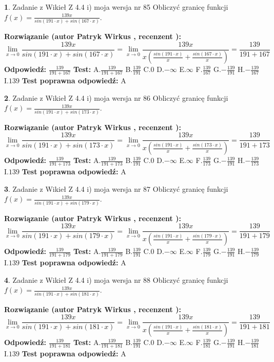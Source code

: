 \documentclass[12pt, a4paper]{article}
\theoremstyle{definition} %
\newtheorem{zad}{}
\newcommand{\zadStart}[1]{\begin{zad}#1\newline}
\newcommand{\zadStop}{\end{zad}}
\newcommand{\rozwStart}[2]{\noindent \textbf{Rozwiązanie (autor #1 , recenzent #2): }\newline}
\newcommand{\rozwStop}{\newline}
\newcommand{\odpStart}{\noindent \textbf{Odpowiedź:}\newline}
\newcommand{\odpStop}{\newline}
\newcommand{\testStart}{\noindent \textbf{Test:}\newline}
\newcommand{\testStop}{\newline}
\newcommand{\kluczStart}{\noindent \textbf{Test poprawna odpowiedź:}\newline}
\newcommand{\kluczStop}{\newline}
\begin{document}
\zadStart{Zadanie z Wikieł Z 4.4 i) moja wersja nr 85}
Obliczyć granicę funkcji $f(x)=\frac{139x}{sin(191\cdot x) +sin(167\cdot x)}$.
\zadStop
\rozwStart{Patryk Wirkus}{}
$$\lim\limits_{x\to 0}\frac{139x}{sin(191\cdot x) +sin(167\cdot x)}=\lim\limits_{x\to 0}\frac{139x}{x(\frac{sin(191\cdot x)}{x}+\frac{sin(167\cdot x)}{x})}=\frac{139}{191+167}$$
\rozwStop
\odpStart
$\frac{139}{191+167}$
\odpStop
\testStart
A.$\frac{139}{191+167}$
B.$\frac{139}{191}$
C.$0$
D.$-\infty$
E.$\infty$
F.$\frac{139}{167}$
G.$-\frac{139}{191}$
H.$-\frac{139}{167}$
I.$139$
\testStop
\kluczStart
A
\kluczStop



\zadStart{Zadanie z Wikieł Z 4.4 i) moja wersja nr 86}
Obliczyć granicę funkcji $f(x)=\frac{139x}{sin(191\cdot x) +sin(173\cdot x)}$.
\zadStop
\rozwStart{Patryk Wirkus}{}
$$\lim\limits_{x\to 0}\frac{139x}{sin(191\cdot x) +sin(173\cdot x)}=\lim\limits_{x\to 0}\frac{139x}{x(\frac{sin(191\cdot x)}{x}+\frac{sin(173\cdot x)}{x})}=\frac{139}{191+173}$$
\rozwStop
\odpStart
$\frac{139}{191+173}$
\odpStop
\testStart
A.$\frac{139}{191+173}$
B.$\frac{139}{191}$
C.$0$
D.$-\infty$
E.$\infty$
F.$\frac{139}{173}$
G.$-\frac{139}{191}$
H.$-\frac{139}{173}$
I.$139$
\testStop
\kluczStart
A
\kluczStop



\zadStart{Zadanie z Wikieł Z 4.4 i) moja wersja nr 87}
Obliczyć granicę funkcji $f(x)=\frac{139x}{sin(191\cdot x) +sin(179\cdot x)}$.
\zadStop
\rozwStart{Patryk Wirkus}{}
$$\lim\limits_{x\to 0}\frac{139x}{sin(191\cdot x) +sin(179\cdot x)}=\lim\limits_{x\to 0}\frac{139x}{x(\frac{sin(191\cdot x)}{x}+\frac{sin(179\cdot x)}{x})}=\frac{139}{191+179}$$
\rozwStop
\odpStart
$\frac{139}{191+179}$
\odpStop
\testStart
A.$\frac{139}{191+179}$
B.$\frac{139}{191}$
C.$0$
D.$-\infty$
E.$\infty$
F.$\frac{139}{179}$
G.$-\frac{139}{191}$
H.$-\frac{139}{179}$
I.$139$
\testStop
\kluczStart
A
\kluczStop



\zadStart{Zadanie z Wikieł Z 4.4 i) moja wersja nr 88}
Obliczyć granicę funkcji $f(x)=\frac{139x}{sin(191\cdot x) +sin(181\cdot x)}$.
\zadStop
\rozwStart{Patryk Wirkus}{}
$$\lim\limits_{x\to 0}\frac{139x}{sin(191\cdot x) +sin(181\cdot x)}=\lim\limits_{x\to 0}\frac{139x}{x(\frac{sin(191\cdot x)}{x}+\frac{sin(181\cdot x)}{x})}=\frac{139}{191+181}$$
\rozwStop
\odpStart
$\frac{139}{191+181}$
\odpStop
\testStart
A.$\frac{139}{191+181}$
B.$\frac{139}{191}$
C.$0$
D.$-\infty$
E.$\infty$
F.$\frac{139}{181}$
G.$-\frac{139}{191}$
H.$-\frac{139}{181}$
I.$139$
\testStop
\kluczStart
A
\kluczStop
\end{document}
